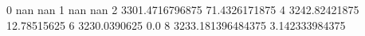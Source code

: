 0 nan nan
1 nan nan
2 3301.4716796875 71.4326171875
4 3242.82421875 12.78515625
6 3230.0390625 0.0
8 3233.181396484375 3.142333984375
